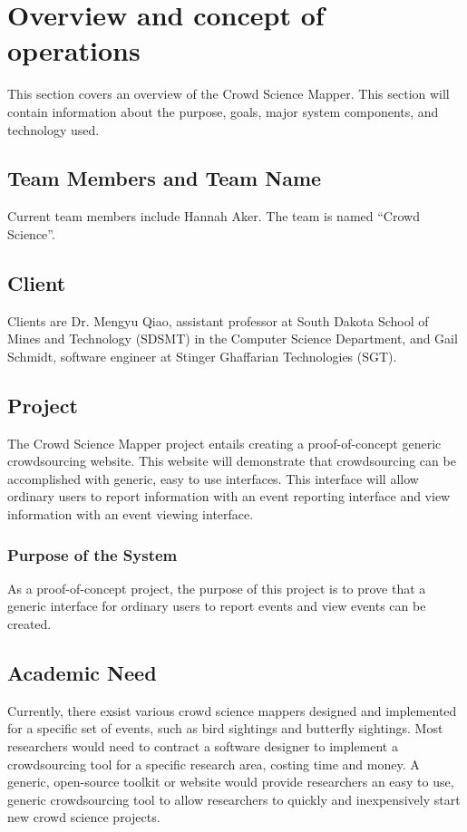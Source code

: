 

\chapter{Overview and concept of operations}

This section covers an overview of the Crowd Science Mapper. This section will contain information about the purpose, goals, major system components, and technology used.

\section{Team Members and Team Name}
Current team members include Hannah Aker. The team is named ``Crowd Science''.

\section{Client}
Clients are Dr. Mengyu Qiao, assistant professor at South Dakota School of Mines and Technology (SDSMT) in the Computer Science Department, and Gail Schmidt, software engineer at Stinger Ghaffarian Technologies (SGT).

\section{Project}
The Crowd Science Mapper project entails creating a proof-of-concept generic crowdsourcing website. This website will demonstrate that crowdsourcing can be accomplished with generic, easy to use interfaces. This interface will allow ordinary users to report information with an event reporting interface and view information with an event viewing interface.

\subsection{Purpose of the System}
As a proof-of-concept project, the purpose of this project is to prove that a generic interface for ordinary users to report events and view events can be created.

\section{Academic Need}
Currently, there exsist various crowd science mappers designed and implemented for a specific set of events, such as bird sightings and butterfly sightings. Most researchers would need to contract a software designer to implement a crowdsourcing tool for a specific research area, costing time and money. A generic, open-source toolkit or website would provide researchers an easy to use, generic crowdsourcing tool to allow researchers to quickly and inexpensively start new crowd science projects. 

